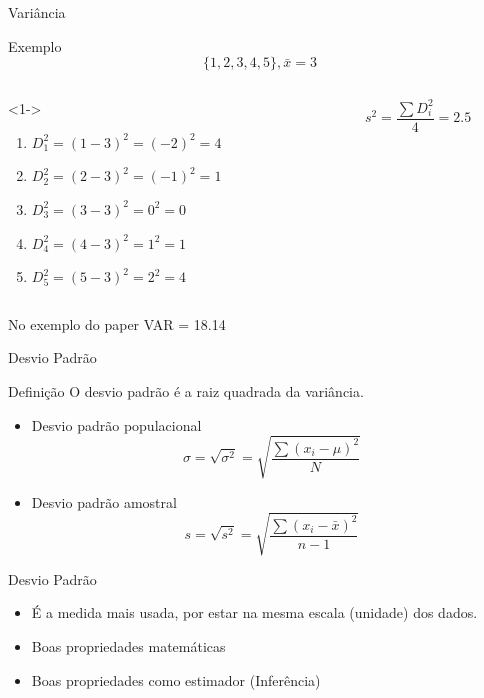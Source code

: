 \documentclass{beamer}
\begin{document}
\begin{frame}{\scriptsize Variância}
  \begin{exampleblock}{Exemplo}
    \footnotesize
      \begin{displaymath}
    \{1,2,3,4,5\}, \bar{x} = 3
  \end{displaymath}
  \begin{columns}
    \begin{column}{6cm}<1->
      \begin{enumerate}
        \footnotesize
      \item $D_1^2 = (1-3)^2 = (-2)^2 = 4$
      \item $D_2^2 = (2-3)^2 = (-1)^2 = 1$
      \item $D_3^2 = (3-3)^2 = 0^2 =0$
      \item $D_4^2 = (4-3)^2 = 1^2 = 1$
      \item $D_5^2 = (5-3)^2 = 2^2 = 4 $
      \end{enumerate}
    \end{column}
    \begin{column}{4cm}
      \begin{displaymath}
        s^2 = \frac{\sum D_i^2}{4} = 2.5
      \end{displaymath}
    \end{column}
  \end{columns}
  \end{exampleblock}
  \begin{block}{No exemplo do paper}
    \footnotesize
    VAR = 18.14
  \end{block}
\end{frame}

\begin{frame}{\scriptsize Desvio Padrão}
  \begin{block}{Definição}
    O desvio padrão é a raiz quadrada da variância.
  \end{block}
  \begin{itemize}
    \footnotesize
  \item Desvio padrão populacional
    $$ \sigma = \sqrt{ \sigma^2 } = \sqrt{ \frac{\sum (x_i - \mu)^2}{N} } $$
  \item Desvio padrão amostral
    $$ s = \sqrt{s^2 } = \sqrt{ \frac{\sum (x_i - \bar{x})^2}{n-1} } $$
  \end{itemize}
\end{frame}

\begin{frame}{\scriptsize Desvio Padrão}
  \begin{itemize}
    \footnotesize
  \item É a medida mais usada, por estar na mesma escala (unidade) dos
    dados.
  \item Boas propriedades matemáticas
  \item Boas propriedades como estimador (Inferência)
  \end{itemize}
\end{frame}
\end{document}
